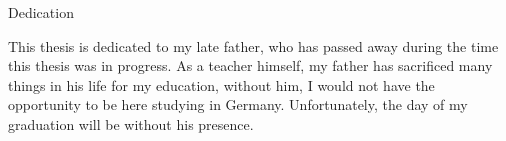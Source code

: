 \makeatletter
{}
{}
\makeatother
\thispagestyle{empty}

\vspace*{20mm}

\begin{center}
\makeatletter
{}
{ Dedication}
\makeatother
\end{center}

\vspace{10mm}


This thesis is dedicated to my late father, who has passed away during the time this thesis was in progress. As a teacher himself, my father has sacrificed many things in his life for my education, without him, I would not have the opportunity to be here studying in Germany. Unfortunately, the day of my graduation will be without his presence.







\cleardoublepage{}
